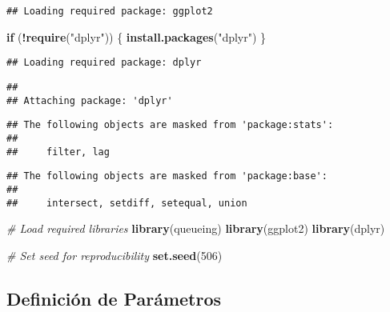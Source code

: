 \documentclass[
]{article}
\newenvironment{Shaded}{\begin{snugshade}}{\end{snugshade}}
\newcommand{\CommentTok}[1]{\textcolor[rgb]{0.56,0.35,0.01}{\textit{#1}}}
\newcommand{\ControlFlowTok}[1]{\textcolor[rgb]{0.13,0.29,0.53}{\textbf{#1}}}
\newcommand{\DecValTok}[1]{\textcolor[rgb]{0.00,0.00,0.81}{#1}}
\newcommand{\FunctionTok}[1]{\textcolor[rgb]{0.13,0.29,0.53}{\textbf{#1}}}
\newcommand{\NormalTok}[1]{#1}
\newcommand{\SpecialCharTok}[1]{\textcolor[rgb]{0.81,0.36,0.00}{\textbf{#1}}}
\newcommand{\StringTok}[1]{\textcolor[rgb]{0.31,0.60,0.02}{#1}}
\begin{document}
\begin{verbatim}
## Loading required package: ggplot2
\end{verbatim}

\begin{Shaded}
\begin{Highlighting}[]
\ControlFlowTok{if}\NormalTok{ (}\SpecialCharTok{!}\FunctionTok{require}\NormalTok{(}\StringTok{"dplyr"}\NormalTok{)) \{}
  \FunctionTok{install.packages}\NormalTok{(}\StringTok{"dplyr"}\NormalTok{)}
\NormalTok{\}}
\end{Highlighting}
\end{Shaded}

\begin{verbatim}
## Loading required package: dplyr
\end{verbatim}

\begin{verbatim}
## 
## Attaching package: 'dplyr'
\end{verbatim}

\begin{verbatim}
## The following objects are masked from 'package:stats':
## 
##     filter, lag
\end{verbatim}

\begin{verbatim}
## The following objects are masked from 'package:base':
## 
##     intersect, setdiff, setequal, union
\end{verbatim}

\begin{Shaded}
\begin{Highlighting}[]
\CommentTok{\# Load required libraries}
\FunctionTok{library}\NormalTok{(queueing)}
\FunctionTok{library}\NormalTok{(ggplot2)}
\FunctionTok{library}\NormalTok{(dplyr)}

\CommentTok{\# Set seed for reproducibility}
\FunctionTok{set.seed}\NormalTok{(}\DecValTok{506}\NormalTok{)}
\end{Highlighting}
\end{Shaded}

\subsection{Definición de
Parámetros}\label{definiciuxf3n-de-paruxe1metros}
\end{document}
